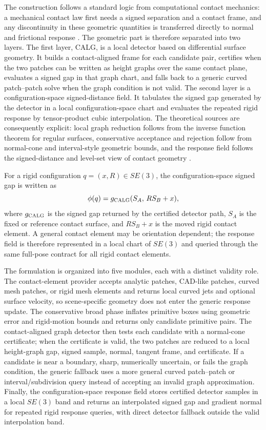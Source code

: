 \documentclass[preprint,12pt]{elsarticle}
\newcommand{\calg}{\textsc{CALG}}
\begin{document}
The construction follows a standard logic from computational contact mechanics: a mechanical contact law first needs a signed separation and a contact frame, and any discontinuity in these geometric quantities is transferred directly to normal and frictional response \cite{laursen2002,wriggers2006}. The geometric part is therefore separated into two layers. The first layer, \calg{}, is a local detector based on differential surface geometry. It builds a contact-aligned frame for each candidate pair, certifies when the two patches can be written as height graphs over the same contact plane, evaluates a signed gap in that graph chart, and falls back to a generic curved patch--patch solve when the graph condition is not valid. The second layer is a configuration-space signed-distance field. It tabulates the signed gap generated by the detector in a local configuration-space chart and evaluates the repeated rigid response by tensor-product cubic interpolation. The theoretical sources are consequently explicit: local graph reduction follows from the inverse function theorem for regular surfaces, conservative acceptance and rejection follow from normal-cone and interval-style geometric bounds, and the response field follows the signed-distance and level-set view of contact geometry \cite{osher1988,jones2006}.

For a rigid configuration $q=(x,R)\in SE(3)$, the configuration-space signed gap is written as
\begin{equation}
    \phi(q)=g_{\calg}(S_A,\,R S_B+x),
    \label{eq:phi_from_calg}
\end{equation}
where $g_{\calg}$ is the signed gap returned by the certified detector path, $S_A$ is the fixed or reference contact surface, and $R S_B+x$ is the moved rigid contact element. A general contact element may be orientation dependent; the response field is therefore represented in a local chart of $SE(3)$ and queried through the same full-pose contract for all rigid contact elements.

The formulation is organized into five modules, each with a distinct validity role. The contact-element provider accepts analytic patches, CAD-like patches, curved mesh patches, or rigid mesh elements and returns local curved jets and optional surface velocity, so scene-specific geometry does not enter the generic response update. The conservative broad phase inflates primitive boxes using geometric error and rigid-motion bounds and returns only candidate primitive pairs. The contact-aligned graph detector then tests each candidate with a normal-cone certificate; when the certificate is valid, the two patches are reduced to a local height-graph gap, signed sample, normal, tangent frame, and certificate. If a candidate is near a boundary, sharp, numerically uncertain, or fails the graph condition, the generic fallback uses a more general curved patch--patch or interval/subdivision query instead of accepting an invalid graph approximation. Finally, the configuration-space response field stores certified detector samples in a local $SE(3)$ band and returns an interpolated signed gap and gradient normal for repeated rigid response queries, with direct detector fallback outside the valid interpolation band.
\end{document}
